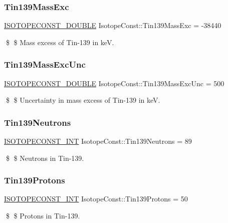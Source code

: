 \subsubsection{\texorpdfstring{Tin139\+Mass\+Exc}{Tin139MassExc}}
{\footnotesize\ttfamily \mbox{\hyperlink{group___isotope_const-_macros_ga8f45a7272ce02c0b4c65c44636ed719a}{I\+S\+O\+T\+O\+P\+E\+C\+O\+N\+S\+T\+\_\+\+D\+O\+U\+B\+LE}} Isotope\+Const\+::\+Tin139\+Mass\+Exc = -\/38440}

\$ \$ Mass excess of Tin-\/139 in keV. \mbox{\label{group___isotope_const-_tin-_sn139_gad206a735a1633607de3214eacd5dea10}} 
\subsubsection{\texorpdfstring{Tin139\+Mass\+Exc\+Unc}{Tin139MassExcUnc}}
{\footnotesize\ttfamily \mbox{\hyperlink{group___isotope_const-_macros_ga8f45a7272ce02c0b4c65c44636ed719a}{I\+S\+O\+T\+O\+P\+E\+C\+O\+N\+S\+T\+\_\+\+D\+O\+U\+B\+LE}} Isotope\+Const\+::\+Tin139\+Mass\+Exc\+Unc = 500}

\$ \$ Uncertainty in mass excess of Tin-\/139 in keV. \mbox{\label{group___isotope_const-_tin-_sn139_ga37e2f09bd33670cd802c818f29c542f6}} 
\subsubsection{\texorpdfstring{Tin139\+Neutrons}{Tin139Neutrons}}
{\footnotesize\ttfamily \mbox{\hyperlink{group___isotope_const-_macros_ga5f18360b3e99483a35c32d789e62621c}{I\+S\+O\+T\+O\+P\+E\+C\+O\+N\+S\+T\+\_\+\+I\+NT}} Isotope\+Const\+::\+Tin139\+Neutrons = 89}

\$ \$ Neutrons in Tin-\/139. \mbox{\label{group___isotope_const-_tin-_sn139_ga8aed77912af1c4cadcb14d8893ddeae8}} 
\subsubsection{\texorpdfstring{Tin139\+Protons}{Tin139Protons}}
{\footnotesize\ttfamily \mbox{\hyperlink{group___isotope_const-_macros_ga5f18360b3e99483a35c32d789e62621c}{I\+S\+O\+T\+O\+P\+E\+C\+O\+N\+S\+T\+\_\+\+I\+NT}} Isotope\+Const\+::\+Tin139\+Protons = 50}

\$ \$ Protons in Tin-\/139. 